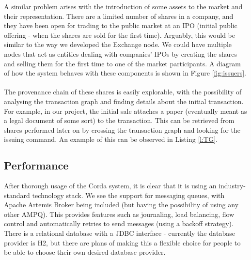 \documentclass[12pt,twoside]{article}
\begin{document}
A similar problem arises with the introduction of some assets to the market and their representation. There are a limited number of shares in a company, and they have been open for trading to the public market at an IPO (initial public offering - when the shares are sold for the first time). Arguably, this would be similar to the way we developed the Exchange node. We could have multiple nodes that act as entities dealing with companies' IPOs by creating the shares and selling them for the first time to one of the market participants. A diagram of how the system behaves with these components is shown in Figure \ref{fig:issuers}.
\\ \\
The provenance chain of these shares is easily explorable, with the possibility of analysing the transaction graph and finding details about the initial transaction. For example, in our project, the initial sale attaches a paper (eventually meant as a legal document of some sort) to the transaction. This can be retrieved from shares performed later on by crossing the transaction graph and looking for the issuing command. An example of this can be observed in Listing \ref{l:TG}. 

\subsection{Performance}
\label{sub:Performance}
After thorough usage of the Corda system, it is clear that it is using an industry-standard technology stack. We see the support for messaging queues, with Apache Artemis Broker being included (but having the possibility of using any other AMPQ). This provides features such as journaling, load balancing, flow control and automatically retries to send messages (using a backoff strategy). There is a relational database with a JDBC interface - currently the database provider is H2, but there are plans of making this a flexible choice for people to be able to choose their own desired database provider.
\end{document}
